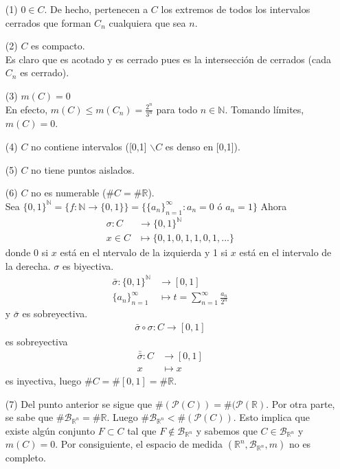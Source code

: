 \begin{enumerate}
    \item[(1)] $0 \in C$. De hecho, pertenecen a $C$ los extremos de todos los intervalos cerrados que forman $C_n$ cualquiera que sea $n$.
    \item[(2)] $C$ es compacto.
    \\
    \newline Es claro que es acotado y es cerrado pues es la intersección de cerrados (cada $C_n$ es cerrado).
    \item[(3)] $m(C) = 0$
    \\
    \newline
    En efecto, $m(C) \leq m(C_n) = \frac{2^n}{3^n}$ para todo $n \in \mathbb{N}$. Tomando límites, $m(C) = 0$.
    \item[(4)] $C$ no contiene intervalos ([0,1] $\backslash C$ es denso en [0,1]).
    \item[(5)] $C$ no tiene puntos aislados.
    \item[(6)] $C$ no es numerable ($\#C = \#\mathbb{R}$).
    \\
    \newline
    Sea $\{ 0,1 \}^{\mathbb{N}} = \{ f: \mathbb{N} \longrightarrow \{0,1\}\} = \{ \{a_n\}_{n=1}^{\infty} : a_n = 0 \text{ ó } a_n = 1\}$
    Ahora
    \begin{align*}
        \sigma: C &\longrightarrow \{ 0,1 \}^{\mathbb{N}}\\
     x \in C &\longmapsto \{ 0,1,0,1,1,0,1,...\}
    \end{align*}
    donde 0 si $x$ está en el ntervalo de la izquierda y 1 si $x$ está en el intervalo de la derecha. $\sigma$ es  biyectiva.
    \begin{align*}
        \bar{\sigma}: \{ 0,1 \}^{\mathbb{N}} &\longrightarrow [0,1]\\
        \{a_n\}_{n=1}^{\infty} &\longmapsto t = \sum_{n=1}^{\infty}\frac{a_n}{2^n}
    \end{align*}
    y $\bar{\sigma}$ es sobreyectiva.
    \begin{align*}
        \bar{\sigma} \circ{} \sigma: C \longrightarrow [0,1]
    \end{align*}
    es sobreyectiva
    \begin{align*}
        \bar{\bar{\sigma}}: C &\longrightarrow [0,1]\\
        x &\longmapsto x
    \end{align*}
    es inyectiva, luego $\#C = \#[0,1] = \#\mathbb{R}$. 
    \item[(7)] Del punto anterior se sigue que $\#(\mathcal{P}(C)) = \#(\mathcal{P}(\mathbb{R})$. Por otra parte, se sabe que $\#\mathcal{B}_{\mathbb{R}^n} = \#\mathbb{R}$. Luego $\#\mathcal{B}_{\mathbb{R}^n} < \#(\mathcal{P}(C))$. Esto implica que existe algún conjunto $F \subset C$ tal que $F \not \in \mathcal{B}_{\mathbb{R}^n}$ y sabemos que $C \in \mathcal{B}_{\mathbb{R}^n}$ y $m(C) = 0$. Por consiguiente, el espacio de medida $(\mathbb{R}^n, \mathcal{B}_{\mathbb{R}^n}, m)$ no es completo.
\end{enumerate}

